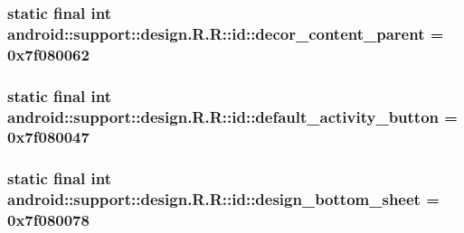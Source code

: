\hypertarget{classandroid_1_1support_1_1design_1_1_r_1_1id_6ed35687cbd1f22b07483b0fd454cd96}{
\subsubsection[{decor\_\-content\_\-parent}]{\setlength{\rightskip}{0pt plus 5cm}static final int android::support::design.R.R::id::decor\_\-content\_\-parent = 0x7f080062}}
\label{classandroid_1_1support_1_1design_1_1_r_1_1id_6ed35687cbd1f22b07483b0fd454cd96}


\hypertarget{classandroid_1_1support_1_1design_1_1_r_1_1id_4fe6dfc8c9b044a1c8e6a0cb33730f74}{
\subsubsection[{default\_\-activity\_\-button}]{\setlength{\rightskip}{0pt plus 5cm}static final int android::support::design.R.R::id::default\_\-activity\_\-button = 0x7f080047}}
\label{classandroid_1_1support_1_1design_1_1_r_1_1id_4fe6dfc8c9b044a1c8e6a0cb33730f74}


\hypertarget{classandroid_1_1support_1_1design_1_1_r_1_1id_ddd107ecab47bf364d7db8e6242ba33e}{
\subsubsection[{design\_\-bottom\_\-sheet}]{\setlength{\rightskip}{0pt plus 5cm}static final int android::support::design.R.R::id::design\_\-bottom\_\-sheet = 0x7f080078}}
\label{classandroid_1_1support_1_1design_1_1_r_1_1id_ddd107ecab47bf364d7db8e6242ba33e}


